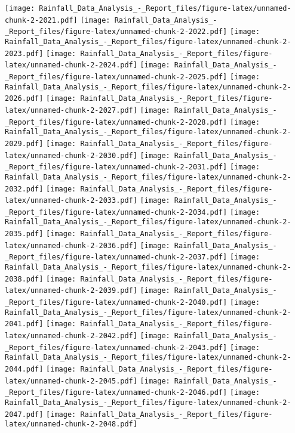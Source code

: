 \documentclass[
]{article}
\begin{document}
\texttt{[image: Rainfall\_Data\_Analysis\_-\_Report\_files/figure-latex/unnamed-chunk-2-2021.pdf]}
\texttt{[image: Rainfall\_Data\_Analysis\_-\_Report\_files/figure-latex/unnamed-chunk-2-2022.pdf]}
\texttt{[image: Rainfall\_Data\_Analysis\_-\_Report\_files/figure-latex/unnamed-chunk-2-2023.pdf]}
\texttt{[image: Rainfall\_Data\_Analysis\_-\_Report\_files/figure-latex/unnamed-chunk-2-2024.pdf]}
\texttt{[image: Rainfall\_Data\_Analysis\_-\_Report\_files/figure-latex/unnamed-chunk-2-2025.pdf]}
\texttt{[image: Rainfall\_Data\_Analysis\_-\_Report\_files/figure-latex/unnamed-chunk-2-2026.pdf]}
\texttt{[image: Rainfall\_Data\_Analysis\_-\_Report\_files/figure-latex/unnamed-chunk-2-2027.pdf]}
\texttt{[image: Rainfall\_Data\_Analysis\_-\_Report\_files/figure-latex/unnamed-chunk-2-2028.pdf]}
\texttt{[image: Rainfall\_Data\_Analysis\_-\_Report\_files/figure-latex/unnamed-chunk-2-2029.pdf]}
\texttt{[image: Rainfall\_Data\_Analysis\_-\_Report\_files/figure-latex/unnamed-chunk-2-2030.pdf]}
\texttt{[image: Rainfall\_Data\_Analysis\_-\_Report\_files/figure-latex/unnamed-chunk-2-2031.pdf]}
\texttt{[image: Rainfall\_Data\_Analysis\_-\_Report\_files/figure-latex/unnamed-chunk-2-2032.pdf]}
\texttt{[image: Rainfall\_Data\_Analysis\_-\_Report\_files/figure-latex/unnamed-chunk-2-2033.pdf]}
\texttt{[image: Rainfall\_Data\_Analysis\_-\_Report\_files/figure-latex/unnamed-chunk-2-2034.pdf]}
\texttt{[image: Rainfall\_Data\_Analysis\_-\_Report\_files/figure-latex/unnamed-chunk-2-2035.pdf]}
\texttt{[image: Rainfall\_Data\_Analysis\_-\_Report\_files/figure-latex/unnamed-chunk-2-2036.pdf]}
\texttt{[image: Rainfall\_Data\_Analysis\_-\_Report\_files/figure-latex/unnamed-chunk-2-2037.pdf]}
\texttt{[image: Rainfall\_Data\_Analysis\_-\_Report\_files/figure-latex/unnamed-chunk-2-2038.pdf]}
\texttt{[image: Rainfall\_Data\_Analysis\_-\_Report\_files/figure-latex/unnamed-chunk-2-2039.pdf]}
\texttt{[image: Rainfall\_Data\_Analysis\_-\_Report\_files/figure-latex/unnamed-chunk-2-2040.pdf]}
\texttt{[image: Rainfall\_Data\_Analysis\_-\_Report\_files/figure-latex/unnamed-chunk-2-2041.pdf]}
\texttt{[image: Rainfall\_Data\_Analysis\_-\_Report\_files/figure-latex/unnamed-chunk-2-2042.pdf]}
\texttt{[image: Rainfall\_Data\_Analysis\_-\_Report\_files/figure-latex/unnamed-chunk-2-2043.pdf]}
\texttt{[image: Rainfall\_Data\_Analysis\_-\_Report\_files/figure-latex/unnamed-chunk-2-2044.pdf]}
\texttt{[image: Rainfall\_Data\_Analysis\_-\_Report\_files/figure-latex/unnamed-chunk-2-2045.pdf]}
\texttt{[image: Rainfall\_Data\_Analysis\_-\_Report\_files/figure-latex/unnamed-chunk-2-2046.pdf]}
\texttt{[image: Rainfall\_Data\_Analysis\_-\_Report\_files/figure-latex/unnamed-chunk-2-2047.pdf]}
\texttt{[image: Rainfall\_Data\_Analysis\_-\_Report\_files/figure-latex/unnamed-chunk-2-2048.pdf]}
\end{document}
